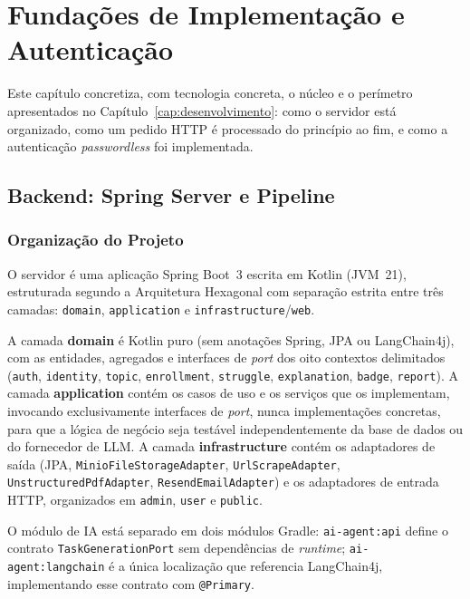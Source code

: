 %
%
\chapter{Fundações de Implementação e Autenticação} \label{cap:fundacoes-implementacao}

Este capítulo concretiza, com tecnologia concreta, o núcleo e o perímetro apresentados no Capítulo~\ref{cap:desenvolvimento}: como o servidor está organizado, como um pedido HTTP é processado do princípio ao fim, e como a autenticação \textit{passwordless} foi implementada.

\section{Backend: Spring Server e Pipeline} \label{sec:backend}

\subsection{Organização do Projeto} \label{sec:org-projeto}

O servidor é uma aplicação Spring Boot~3 escrita em Kotlin (JVM~21), estruturada segundo a Arquitetura Hexagonal com separação estrita entre três camadas: \texttt{domain}, \texttt{application} e \texttt{infrastructure}/\texttt{web}.

A camada \textbf{domain} é Kotlin puro (sem anotações Spring, JPA ou LangChain4j), com as entidades, agregados e interfaces de \textit{port} dos oito contextos delimitados (\texttt{auth}, \texttt{identity}, \texttt{topic}, \texttt{enrollment}, \texttt{struggle}, \texttt{explanation}, \texttt{badge}, \texttt{report}). A camada \textbf{application} contém os casos de uso e os serviços que os implementam, invocando exclusivamente interfaces de \textit{port}, nunca implementações concretas, para que a lógica de negócio seja testável independentemente da base de dados ou do fornecedor de LLM. A camada \textbf{infrastructure} contém os adaptadores de saída (JPA, \texttt{MinioFileStorageAdapter}, \texttt{UrlScrapeAdapter}, \texttt{UnstructuredPdfAdapter}, \texttt{ResendEmailAdapter}) e os adaptadores de entrada HTTP, organizados em \texttt{admin}, \texttt{user} e \texttt{public}.

O módulo de IA está separado em dois módulos Gradle: \texttt{ai-agent:api} define o contrato \texttt{TaskGenerationPort} sem dependências de \textit{runtime}; \texttt{ai-agent:langchain} é a única localização que referencia LangChain4j, implementando esse contrato com \texttt{@Primary}.


